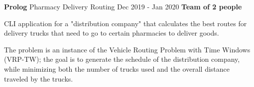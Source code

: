 \cventry
  {\textbf{Prolog}}
  {Pharmacy Delivery Routing \href{https://github.com/EduRibeiro00/PharmacyDeliveryRouting-feup-plog}{\faExternalLink}} %
  {Dec 2019 - Jan 2020}
  {\textbf{Team of 2 people}}
  {
    \begin{cvitems} %
      \item {CLI application for a "distribution company" that calculates the best routes for delivery trucks that need to go to certain pharmacies to deliver goods.}
      \item {The problem is an instance of the Vehicle Routing Problem with Time Windows (VRP-TW); the goal is to generate the schedule of the distribution company, while minimizing both the number of trucks used and the overall distance traveled by the trucks.}
    \end{cvitems}
  }